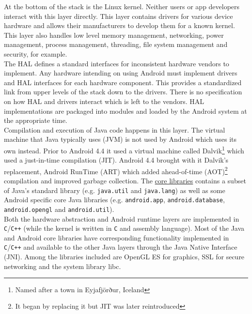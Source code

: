 At the bottom of the stack is the Linux kernel. Neither users or app developers interact with this layer directly. This layer contains drivers for various device hardware and allows their manufacturers to develop them for a known kernel. This layer also handles low level memory management, networking, power management, process management, threading, file system management and security, for example.\\

The HAL defines a standard interfaces for inconsistent hardware vendors to implement. Any hardware intending on using Android must implement drivers and HAL interfaces for each hardware component. This provides a standardized link from upper levels of the stack down to the drivers. There is no specification on how HAL and drivers interact which is left to the vendors. HAL implementations are packaged into modules and loaded by the Android system at the appropriate time.\\

Compilation and execution of Java code happens in this layer. The virtual machine that Java typically uses (JVM) is not used by Android which uses its own instead. Prior to Android 4.4 it used a virtual machine called Dalvik\footnote{Named after a town in Eyjafjörður, Iceland} which used a just-in-time compilation (JIT). Android 4.4 brought with it Dalvik's replacement, Android RunTime (ART) which added ahead-of-time (AOT)\footnote{It began by replacing it but JIT was later reintroduced} compilation and improved garbage collection. The \href{https://developer.android.com/reference/classes.html}{core libraries} contains a subset of Java's standard library (e.g. \texttt{java.util} and \texttt{java.lang}) as well as some Android specific core Java libraries (e.g. \texttt{android.app}, \texttt{android.database}, \texttt{android.opengl} and \texttt{android.util}).\\

Both the hardware abstraction and Android runtime layers are implemented in \texttt{C}/\texttt{C++} (while the kernel is written in \texttt{C} and assembly language). Most of the Java and Android core libraries have corresponding functionality implemented in \texttt{C}/\texttt{C++} and available to the other Java layers through the Java Native Interface (JNI). Among the libraries included are OpenGL ES for graphics, SSL for secure networking and the system library libc.\\

